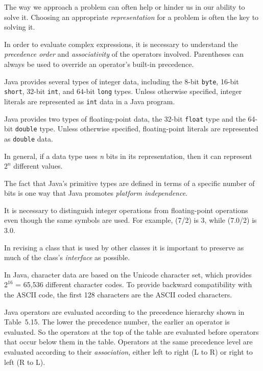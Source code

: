 \begin{SMBL}
\item  The way we approach a problem can often help
or hinder us in our ability to solve it. Choosing an appropriate {\it
representation} for a problem is often the key to solving it.

\item  In order to evaluate complex expressions, it is necessary to
understand the {\it precedence order} and {\it associativity} of the
operators involved. Parentheses can always be used to override an
operator's built-in precedence.

\item  Java provides several types of integer data, including the
8-bit {\tt byte}, 16-bit {\tt short}, 32-bit {\tt int}, and 64-bit
{\tt long} types. Unless otherwise specified, integer literals are
represented as {\tt int} data in a Java program.

\item  Java provides two types of floating-point data, the 32-bit
{\tt float} type and the 64-bit {\tt double} type. Unless otherwise
specified, floating-point literals are represented as {\tt double}
data.

\item  In general, if a data type uses {\it n} bits in its representation,
then it can represent $2^n$ different values.

\item  The fact that Java's primitive types are defined in terms
of a specific number of bits is one way that Java promotes {\it
platform independence}.

\item  It is necessary to distinguish integer operations from
floating-point operations even though the same symbols are used.
For example, (7/2) is 3, while (7.0/2) is 3.0.

\item  In revising a class
that is used by other classes it is important to preserve as much of
the class's {\it interface} as possible.

\item  In Java, character data are based on the Unicode character set,
which provides $2^{16}$ = 65,536 different character codes. To provide
backward compatibility with the ASCII code, the first 128 characters
are the ASCII coded characters.

\item Java operators are evaluated according to the precedence hierarchy
shown in Table~5.15. The lower the precedence
number, the earlier an operator is evaluated. So the operators at the
top of the table are evaluated before operators that occur below them
in the table.  Operators at the same precedence level are evaluated
according to their {\it association}, either left to right (L to R)
or right to left (R to L).


\end{SMBL}
